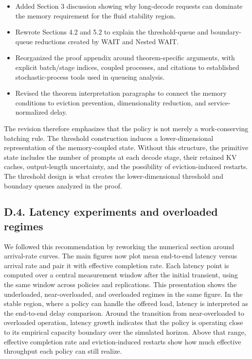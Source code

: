 \changes
\begin{itemize}
    \item Added Section 3 discussion showing why long-decode requests can dominate the memory requirement for the fluid stability region.
    \item Rewrote Sections 4.2 and 5.2 to explain the threshold-queue and boundary-queue reductions created by WAIT and Nested WAIT.
    \item Reorganized the proof appendix around theorem-specific arguments, with explicit batch/stage indices, coupled processes, and citations to established stochastic-process tools used in queueing analysis.
    \item Revised the theorem interpretation paragraphs to connect the memory conditions to eviction prevention, dimensionality reduction, and service-normalized delay.
\end{itemize}

\vspace{0.25em}
\noindent The revision therefore emphasizes that the policy is not merely a work-conserving batching rule. The threshold construction induces a lower-dimensional representation of the memory-coupled state. Without this structure, the primitive state includes the number of prompts at each decode stage, their retained KV caches, output-length uncertainty, and the possibility of eviction-induced restarts. The threshold design is what creates the lower-dimensional threshold and boundary queues analyzed in the proof.

\subsection*{D.4. Latency experiments and overloaded regimes}


\response We followed this recommendation by reworking the numerical section around arrival-rate curves. The main figures now plot mean end-to-end latency versus arrival rate and pair it with effective completion rate. Each latency point is computed over a central measurement window after the initial transient, using the same window across policies and replications. This presentation shows the underloaded, near-overloaded, and overloaded regimes in the same figure. In the stable region, where a policy can handle the offered load, latency is interpreted as the end-to-end delay comparison. Around the transition from near-overloaded to overloaded operation, latency growth indicates that the policy is operating close to its empirical capacity boundary over the simulated horizon. Above that range, effective completion rate and eviction-induced restarts show how much effective throughput each policy can still realize.

